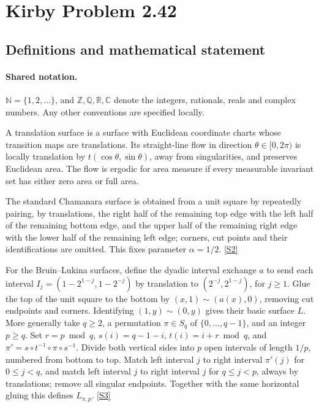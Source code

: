 \documentclass[11pt]{book}
\newcommand{\sref}[2]{\hyperlink{source:#1:#2}{[S#2]}}
\begin{document}
\section{Kirby Problem 2.42}\label{statement}

\subsection{Definitions and mathematical statement}

\paragraph{Shared notation.}$\mathbb N=\{1,2,\ldots\}$, and $\mathbb Z,\mathbb Q,\mathbb R,\mathbb C$ denote the integers, rationals, reals and complex numbers. Any other conventions are specified locally.


A translation surface is a surface with Euclidean coordinate charts whose transition maps are translations. Its straight-line flow in direction $\theta\in[0,2\pi)$ is locally translation by $t(\cos\theta,\sin\theta)$, away from singularities, and preserves Euclidean area. The flow is ergodic for area measure if every measurable invariant set has either zero area or full area.

The standard Chamanara surface is obtained from a unit square by repeatedly pairing, by translations, the right half of the remaining top edge with the left half of the remaining bottom edge, and the upper half of the remaining right edge with the lower half of the remaining left edge; corners, cut points and their identifications are omitted. This fixes parameter $\alpha=1/2$. \sref{statement}{2}

For the Bruin--Lukina surfaces, define the dyadic interval exchange $a$ to send each interval $I_j=(1-2^{1-j},1-2^{-j})$ by translation to $(2^{-j},2^{1-j})$, for $j\geq1$. Glue the top of the unit square to the bottom by $(x,1)\sim(a(x),0)$, removing cut endpoints and corners. Identifying $(1,y)\sim(0,y)$ gives their basic surface $L$. More generally take $q\geq2$, a permutation $\pi\in S_q$ of $\{0,\ldots,q-1\}$, and an integer $p\geq q$. Set $r=p\bmod q$, $s(i)=q-1-i$, $t(i)=i+r\bmod q$, and $\pi'=s\circ t^{-1}\circ\pi\circ s^{-1}$. Divide both vertical sides into $p$ open intervals of length $1/p$, numbered from bottom to top. Match left interval $j$ to right interval $\pi'(j)$ for $0\leq j<q$, and match left interval $j$ to right interval $j$ for $q\leq j<p$, always by translations; remove all singular endpoints. Together with the same horizontal gluing this defines $L_{\pi,p}$. \sref{statement}{3}
\end{document}

